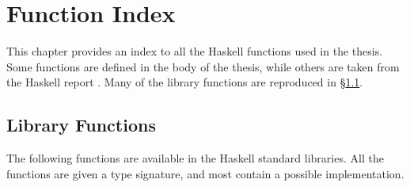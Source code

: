 
\chapter{Function Index}

This chapter provides an index to all the Haskell functions used in the thesis. Some functions are defined in the body of the thesis, while others are taken from the Haskell report \cite{haskell}. Many of the library functions are reproduced in \S\ref{secI:library}.

\renewenvironment{theindex}
    {\thispagestyle{plain}\parindent\z@@
     \parskip\z@@ \@@plus .3\p@@\relax
     \columnseprule \z@@
     \columnsep 35\p@@
     \let\item\@@idxitem}
    {}

\begin{multicols}{2}
\printindex
\end{multicols}


\section{Library Functions}
\label{secI:library}

The following functions are available in the Haskell standard libraries. All the functions are given a type signature, and most contain a possible implementation.

\begin{comment}
\begin{code}
import Prelude(Char,Show,Eq(..),Int,Num(..),Ord(..),otherwise,repeat,Read,Bool(..))
data IO a = IO a
instance Monad IO
\end{code}
\end{comment}



